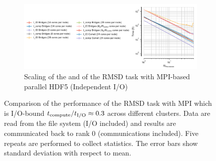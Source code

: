 \begin{figure}[ht!]
\begin{subfigure} {.8\textwidth}
  \includegraphics[width=\linewidth]{figures/Clusters_IO_compute_scaling.pdf}
  \caption{Scaling of the \tcomp and \tIO of the RMSD task with MPI-based parallel HDF5 (Independent I/O)}
  \label{fig:compute-IO-scaling-clusters}
\end{subfigure}
%
\caption{Comparison of the performance of the RMSD task with MPI which is I/O-bound ${t}_{\text{compute}}/{t}_{\text{I/O}} \approx 0.3$
across different clusters. Data are read from the file system (I/O included) and results are communicated back to
rank 0 (communications included). Five repeats are performed to collect statistics. The error bars show
standard deviation with respect to mean.}
 
\label{fig:MPIwithIO}
\end{figure} 


